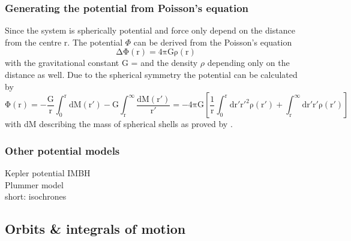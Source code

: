 \subsubsection{Generating the potential from Poisson's equation}
Since the system is spherically potential and force only depend on the distance from the centre r. The potential \(\Phi\) can be derived from the Poisson's equation \begin{equation}\label{eq:Poisson}
\mathrm{\Delta\Phi(r)=4\pi G \rho(r)}
\end{equation}
with the gravitational constant G =  \citep{2015arXiv150707956M} and the density \(\rho\) depending only on the distance as well. Due to the spherical symmetry the potential can be calculated by 
\begin{equation}
\mathrm{\Phi(r)=-\frac{G}{r}\int_0^r{\mathrm{d}M(r')}-G\int_r^{\infty}{\frac{\mathrm{d}M(r')}{r'}}=-4\pi G\left[\frac{1}{r}\int_0^r\mathrm{d}r'r'^2\rho(r')+\int_r^{\infty}\mathrm{d}r'r'\rho(r')\right]}
\end{equation} with dM describing the mass of spherical shells as proved by \citet[eq. 2.28]{2008gady.book.....B}. 
\subsubsection{Other potential models}
Kepler potential IMBH\\Plummer model\\short: isochrones
\subsection{Orbits \& integrals of motion}\label{orbit_int_of_motion_theory}

